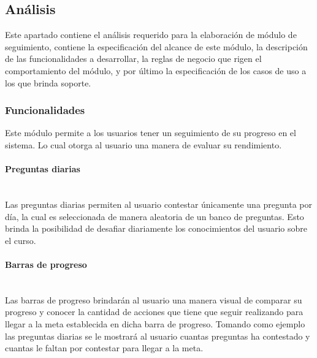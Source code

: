
\subsection{Análisis}

 Este apartado contiene el análisis requerido para la elaboración de módulo de seguimiento,
 contiene la especificación del alcance de este módulo, la descripción de las funcionalidades
 a desarrollar, la reglas de negocio que rigen el comportamiento del módulo, y por último la
 especificación de los casos de uso a los que brinda soporte.


\subsubsection{Funcionalidades}


\noindent
Este módulo permite a los usuarios tener un seguimiento de su progreso en el sistema.
Lo cual otorga al usuario una manera de evaluar su rendimiento.

 \paragraph{Preguntas diarias}\mbox{}\\
 Las preguntas diarias permiten al usuario contestar únicamente una pregunta por día,
 la cual es seleccionada de manera aleatoria de un banco de preguntas.
 Esto brinda la posibilidad de desafiar diariamente los conocimientos del usuario sobre el curso.

 \paragraph{Barras de progreso}\mbox{}\\
 Las barras de progreso brindarán al usuario una manera visual de comparar su progreso y conocer
  la cantidad de acciones que tiene que seguir realizando para llegar a la meta establecida en dicha barra de progreso.
 Tomando como ejemplo las preguntas diarias se le mostrará al usuario cuantas preguntas ha contestado
 y cuantas le faltan por contestar para llegar a la meta.
%
%
\clearpage
